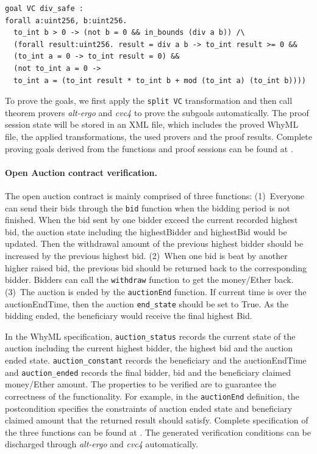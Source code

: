 \documentclass[runningheads]{llncs}
\begin{document}
\begin{verbatim}
goal VC div_safe :
forall a:uint256, b:uint256.
  to_int b > 0 -> (not b = 0 && in_bounds (div a b)) /\
  (forall result:uint256. result = div a b -> to_int result >= 0 &&
  (to_int a = 0 -> to_int result = 0) &&
  (not to_int a = 0 ->
  to_int a = (to_int result * to_int b + mod (to_int a) (to_int b))))
\end{verbatim}
To prove the goals, we first apply the \texttt{split VC} transformation and 
then call theorem provers \emph{alt-ergo} and \emph{cvc4} 
to prove the subgoals automatically. The proof session state will be 
stored in an XML file, which includes the proved WhyML file, the applied
transformations, the used provers and the proof results.
Complete proving goals derived from the functions and 
proof sessions can be found at \cite{Examples}.

\paragraph{Open Auction contract verification.}
The open auction contract is mainly comprised of three functions:
(1)~Everyone can send their bids through the \texttt{bid} function when the bidding period is not finished.
When the bid sent by one bidder exceed the current recorded highest bid, the auction state including the highestBidder and highestBid would be updated. Then the withdrawal amount of the previous
highest bidder should be increased by the previous highest bid.
(2)~When one bid is beat by another higher raised bid, the previous bid should be returned back to the
corresponding bidder. Bidders can call the \texttt{withdraw} function to get the money/Ether back.
(3)~The auction is ended by the \texttt{auctionEnd} function. If current time is over the auctionEndTime,
then the auction \texttt{end\_state} should be set to True. As the bidding ended, the beneficiary would 
receive the final highest Bid.

In the WhyML specification, \texttt{auction\_status} records the current state of the auction including the current 
highest bidder, the highest bid and the auction ended state. \texttt{auction\_constant} records the beneficiary and the
auctionEndTime and \texttt{auction\_ended} records the final bidder, bid and the beneficiary claimed money/Ether amount.
The properties to be verified are to guarantee the correctness of the functionality. For example,
in the \texttt{auctionEnd} definition, the postcondition specifies the constraints of 
auction ended state and beneficiary claimed amount that the returned result should satisfy.
Complete specification of the three functions can be found at \cite{Examples}.
The generated verification conditions can be discharged through \emph{alt-ergo} and \emph{cvc4} automatically.
\end{document}
